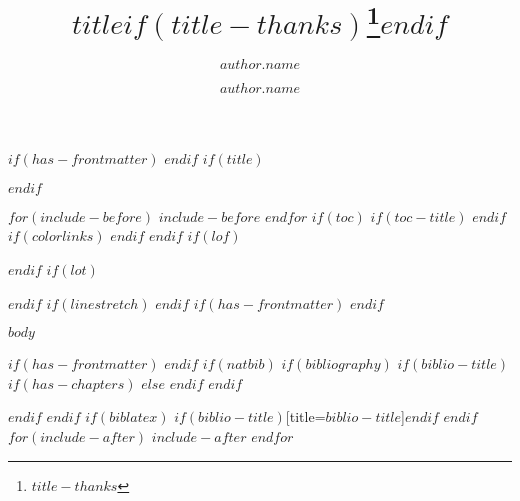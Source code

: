 \documentclass[
$if(fontsize)$
  $fontsize$,
$endif$
$if(papersize)$
  $papersize$paper,
$endif$
$for(classoption)$
  $classoption$$sep$,
$endfor$
]{MRM}
\title{$title$$if(title-thanks)$\protect\thanks{$title-thanks$}$endif$}
\author[$for(author.institute)$$author.institute$$sep$,$endfor$]{$author.name$}{$if(author.orcid)$\orcid{$author.orcid$}$endif$}
\author{$author.name$} et al
\begin{document}
$if(has-frontmatter)$
\frontmatter
$endif$
$if(title)$
\maketitle
$endif$

$for(include-before)$
$include-before$
$endfor$
$if(toc)$
$if(toc-title)$
\renewcommand*\contentsname{$toc-title$}
$endif$
{
$if(colorlinks)$
\hypersetup{linkcolor=$if(toccolor)$$toccolor$$else$$endif$}
$endif$
\setcounter{tocdepth}{$toc-depth$}
\tableofcontents
}
$endif$
$if(lof)$
\listoffigures
$endif$
$if(lot)$
\listoftables
$endif$
$if(linestretch)$
$endif$
$if(has-frontmatter)$
\mainmatter
$endif$

$body$

$if(has-frontmatter)$
\backmatter
$endif$
$if(natbib)$
$if(bibliography)$
$if(biblio-title)$
$if(has-chapters)$
\renewcommand\bibname{$biblio-title$}
$else$
\renewcommand\refname{$biblio-title$}
$endif$
$endif$

$endif$
$endif$
$if(biblatex)$
\printbibliography$if(biblio-title)$[title=$biblio-title$]$endif$
$endif$
$for(include-after)$
$include-after$
$endfor$
\end{document}

